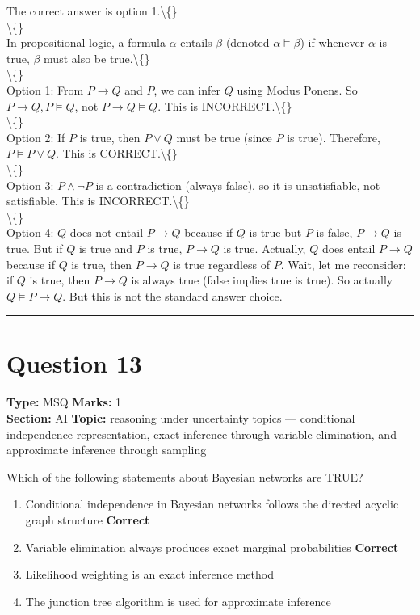 \documentclass[11pt]{article}
\begin{document}
The correct answer is option 1.\textbackslash\{\}\\
\textbackslash\{\}\\
In propositional logic, a formula \(\alpha\) entails \(\beta\) (denoted \(\alpha \models \beta\)) if whenever \(\alpha\) is true, \(\beta\) must also be true.\textbackslash\{\}\\
\textbackslash\{\}\\
Option 1: From \(P \rightarrow Q\) and \(P\), we can infer \(Q\) using Modus Ponens. So \(P \rightarrow Q, P \models Q\), not \(P \rightarrow Q \models Q\). This is INCORRECT.\textbackslash\{\}\\
\textbackslash\{\}\\
Option 2: If \(P\) is true, then \(P \vee Q\) must be true (since \(P\) is true). Therefore, \(P \models P \vee Q\). This is CORRECT.\textbackslash\{\}\\
\textbackslash\{\}\\
Option 3: \(P \wedge \neg P\) is a contradiction (always false), so it is unsatisfiable, not satisfiable. This is INCORRECT.\textbackslash\{\}\\
\textbackslash\{\}\\
Option 4: \(Q\) does not entail \(P \rightarrow Q\) because if \(Q\) is true but \(P\) is false, \(P \rightarrow Q\) is true. But if \(Q\) is true and \(P\) is true, \(P \rightarrow Q\) is true. Actually, \(Q\) does entail \(P \rightarrow Q\) because if \(Q\) is true, then \(P \rightarrow Q\) is true regardless of \(P\). Wait, let me reconsider: if \(Q\) is true, then \(P \rightarrow Q\) is always true (false implies true is true). So actually \(Q \models P \rightarrow Q\). But this is not the standard answer choice.

\vspace{0.8em}
\hrule
\vspace{0.4em}
\section*{Question 13}
\textbf{Type:} MSQ \hfill \textbf{Marks:} 1\\
\textbf{Section:} AI \hfill \textbf{Topic:} reasoning under uncertainty topics — conditional independence representation, exact inference through variable elimination, and approximate inference through sampling

Which of the following statements about Bayesian networks are TRUE?


\begin{enumerate}[label=\textbf{\Alph*.}, leftmargin=1.8em]
\item Conditional independence in Bayesian networks follows the directed acyclic graph structure \hfill {\color{gategreen}\textbf{Correct}}\item Variable elimination always produces exact marginal probabilities \hfill {\color{gategreen}\textbf{Correct}}\item Likelihood weighting is an exact inference method\item The junction tree algorithm is used for approximate inference\end{enumerate}
\end{document}

